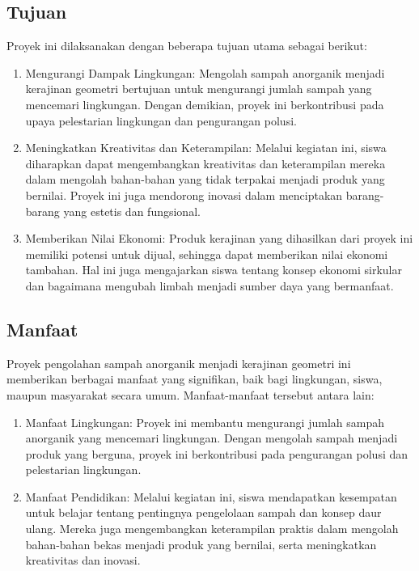 \documentclass[a4paper,12pt, bahasa]{article}
\begin{document}
\subsection{Tujuan}
Proyek ini dilaksanakan dengan beberapa tujuan utama sebagai berikut:  
\begin{enumerate}
    \item     Mengurangi Dampak Lingkungan: Mengolah sampah anorganik menjadi kerajinan geometri bertujuan untuk mengurangi jumlah sampah yang mencemari lingkungan. Dengan demikian, proyek ini berkontribusi pada upaya pelestarian lingkungan dan pengurangan polusi. 
    \item Meningkatkan Kreativitas dan Keterampilan: Melalui kegiatan ini, siswa diharapkan dapat mengembangkan kreativitas dan keterampilan mereka dalam mengolah bahan-bahan yang tidak terpakai menjadi produk yang bernilai. Proyek ini juga mendorong inovasi dalam menciptakan barang-barang yang estetis dan fungsional. 
    \item     Memberikan Nilai Ekonomi: Produk kerajinan yang dihasilkan dari proyek ini memiliki potensi untuk dijual, sehingga dapat memberikan nilai ekonomi tambahan. Hal ini juga mengajarkan siswa tentang konsep ekonomi sirkular dan bagaimana mengubah limbah menjadi sumber daya yang bermanfaat. 
\end{enumerate}

\subsection{Manfaat}
Proyek pengolahan sampah anorganik menjadi kerajinan geometri ini memberikan berbagai manfaat yang signifikan, baik bagi lingkungan, siswa, maupun masyarakat secara umum. Manfaat-manfaat tersebut antara lain: 
\begin{enumerate}
    \item     Manfaat Lingkungan: Proyek ini membantu mengurangi jumlah sampah anorganik yang mencemari lingkungan. Dengan mengolah sampah menjadi produk yang berguna, proyek ini berkontribusi pada pengurangan polusi dan pelestarian lingkungan. 
    \item     Manfaat Pendidikan: Melalui kegiatan ini, siswa mendapatkan kesempatan untuk belajar tentang pentingnya pengelolaan sampah dan konsep daur ulang. Mereka juga mengembangkan keterampilan praktis dalam mengolah bahan-bahan bekas menjadi produk yang bernilai, serta meningkatkan kreativitas dan inovasi. 
\end{enumerate}
\end{document}
